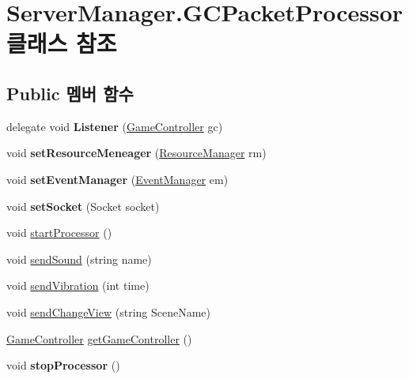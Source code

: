 \hypertarget{class_server_manager_1_1_g_c_packet_processor}{}\section{Server\+Manager.\+G\+C\+Packet\+Processor 클래스 참조}
\label{class_server_manager_1_1_g_c_packet_processor}
\subsection*{Public 멤버 함수}
\begin{DoxyCompactItemize}
\item 
\hypertarget{class_server_manager_1_1_g_c_packet_processor_a0d33dc9f19b414e680949bee2d3a9be7}{}delegate void {\bfseries Listener} (\hyperlink{class_game_controller}{Game\+Controller} gc)\label{class_server_manager_1_1_g_c_packet_processor_a0d33dc9f19b414e680949bee2d3a9be7}

\item 
\hypertarget{class_server_manager_1_1_g_c_packet_processor_aedd912743acb53633850b93b35ab0997}{}void {\bfseries set\+Resource\+Meneager} (\hyperlink{class_resource_manager}{Resource\+Manager} rm)\label{class_server_manager_1_1_g_c_packet_processor_aedd912743acb53633850b93b35ab0997}

\item 
\hypertarget{class_server_manager_1_1_g_c_packet_processor_aedd3fe62e1304e06e85c2a66efa31c11}{}void {\bfseries set\+Event\+Manager} (\hyperlink{class_event_manager}{Event\+Manager} em)\label{class_server_manager_1_1_g_c_packet_processor_aedd3fe62e1304e06e85c2a66efa31c11}

\item 
\hypertarget{class_server_manager_1_1_g_c_packet_processor_ab5beaf78f6e0893059880be46a58ebc2}{}void {\bfseries set\+Socket} (Socket socket)\label{class_server_manager_1_1_g_c_packet_processor_ab5beaf78f6e0893059880be46a58ebc2}

\item 
void \hyperlink{class_server_manager_1_1_g_c_packet_processor_a84746f1af9c687835fb20e58dd65824c}{start\+Processor} ()
\item 
void \hyperlink{class_server_manager_1_1_g_c_packet_processor_af10653ddaeee59e9c300a70a3780457f}{send\+Sound} (string name)
\item 
void \hyperlink{class_server_manager_1_1_g_c_packet_processor_a95466c00108da09905e499103d60c8cb}{send\+Vibration} (int time)
\item 
void \hyperlink{class_server_manager_1_1_g_c_packet_processor_a8baeb542bcec06b8e4f16ae7417896fb}{send\+Change\+View} (string Scene\+Name)
\item 
\hyperlink{class_game_controller}{Game\+Controller} \hyperlink{class_server_manager_1_1_g_c_packet_processor_a35d3770455e7d5ee73c8ae315c5bd1ce}{get\+Game\+Controller} ()
\item 
\hypertarget{class_server_manager_1_1_g_c_packet_processor_a6789b1d7291851798a6b2231539b14b8}{}void {\bfseries stop\+Processor} ()\label{class_server_manager_1_1_g_c_packet_processor_a6789b1d7291851798a6b2231539b14b8}

\end{DoxyCompactItemize}
